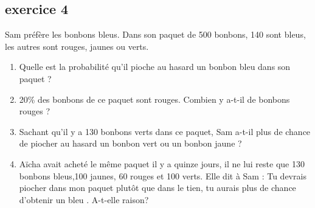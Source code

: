 \documentclass[11pt]{article}
\begin{document}
\begin{multicols}{2}
  \subsection*{exercice 4}
  Sam préfère les bonbons bleus. 
  Dans son paquet de 500 bonbons, 140 sont bleus, les autres sont rouges, jaunes ou verts.

  \begin{enumerate}
  \item Quelle est la probabilité qu’il pioche au hasard un bonbon bleu dans son paquet ?
  \item 20\% des bonbons de ce paquet sont rouges. Combien y a-t-il de bonbons rouges ?
  \item Sachant qu’il y a 130 bonbons verts dans ce paquet, Sam a-t-il plus de chance de piocher au hasard un bonbon vert ou un bonbon jaune ?
  \item Aïcha avait acheté le même paquet il y a quinze jours, il ne lui reste que 130 bonbons bleus,100 jaunes, 60 rouges et 100 verts. Elle dit à Sam : \og Tu devrais piocher dans mon paquet plutôt que dans le tien, tu aurais plus de chance d’obtenir un bleu \fg.
    A-t-elle raison? 
  \end{enumerate}
\end{multicols}
\end{document}
